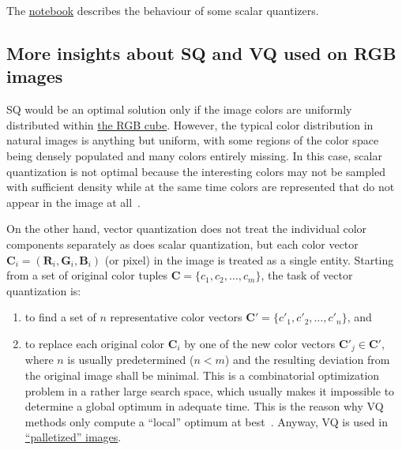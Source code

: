 The \href{https://github.com/Sistemas-Multimedia/Sistemas-Multimedia.github.io/blob/master/milestones/05-RGB_quantization/digital_quantization.ipynb}{notebook} describes the behaviour of some scalar quantizers.

\subsection{More insights about SQ and VQ used on RGB images}
SQ would be an optimal solution only if the image colors are uniformly
distributed within
\href{https://en.wikipedia.org/wiki/RGB_color_model}{the RGB
  cube}. However, the typical color distribution in natural images is
anything but uniform, with some regions of the color space being
densely populated and many colors entirely missing. In this case,
scalar quantization is not optimal because the interesting colors may
not be sampled with suﬃcient density while at the same time colors are
represented that do not appear in the image at
all~\cite{burger2016digital}.

On the other hand, vector quantization does not treat the individual
color components separately as does scalar quantization, but each
color vector
${\mathbf C}_i = ({\mathbf R}_i, {\mathbf G}_i, {\mathbf B}_i )$ (or
pixel) in the image is treated as a single entity. Starting from a set
of original color tuples ${\mathbf C} = \{c_1, c_2, \ldots ,c_m\}$,
the task of vector quantization is:
\begin{enumerate}
\item to ﬁnd a set of $n$ representative color vectors
  ${\mathbf C}' = \{c'_1, c'_2 ,\ldots , c'_n \}$, and
\item to replace each original color ${\mathbf C}_i$ by one of the new
  color vectors ${\mathbf C}'_j\in {\mathbf C}'$, where $n$ is usually
  predetermined ($n < m$) and the resulting deviation from the
  original image shall be minimal. This is a combinatorial
  optimization problem in a rather large search space, which usually
  makes it impossible to determine a global optimum in adequate
  time. This is the reason why VQ methods only compute a ``local''
  optimum at best~\cite{burger2016digital}. Anyway, VQ is used in
  \href{https://en.wikipedia.org/wiki/Palette_(computing)}{``palletized''
    images}.
\end{enumerate}

